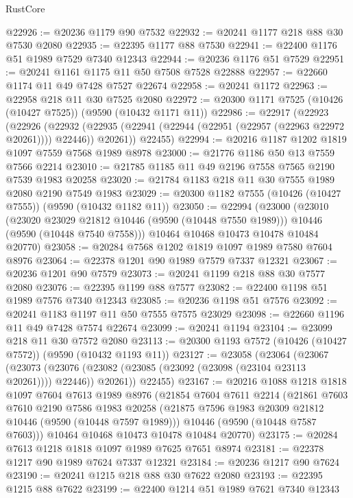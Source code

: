 \begin{lexlean}{RustCore}
\begin{coremodule}
@22926 := @20236 @1179 @90 @7532
@22932 := @20241 @1177 @218 @88 @30 @7530 @2080
@22935 := @22395 @1177 @88 @7530
@22941 := @22400 @1176 @51 @1989 @7529 @7340 @12343
@22944 := @20236 @1176 @51 @7529
@22951 := @20241 @1161 @1175 @11 @50 @7508 @7528 @22888
@22957 := @22660 @1174 @11 @49 @7428 @7527 @22674
@22958 := @20241 @1172
@22963 := @22958 @218 @11 @30 @7525 @2080
@22972 := @20300 @1171 @7525 (@10426 (@10427 @7525)) (@9590 (@10432 @1171 @11))
@22986 := @22917
    (@22923
      (@22926
        (@22932 (@22935 (@22941 (@22944 (@22951 (@22957 (@22963 @22972 @20261)))) @22446)) @20261))
      @22455)
@22994 := @20216 @1187 @1202 @1819 @1097 @7559 @7568 @1989 @8978
@23000 := @21776 @1186 @50 @13 @7559 @7566 @2214
@23010 := @21785 @1185 @11 @49 @2196 @7558 @7565 @2190 @7539 @1983 @20258
@23020 := @21784 @1183 @218 @11 @30 @7555 @1989 @2080 @2190 @7549 @1983
@23029 := @20300 @1182 @7555 (@10426 (@10427 @7555)) (@9590 (@10432 @1182 @11))
@23050 := @22994
    (@23000
      (@23010
        (@23020 @23029 @21812 @10446 (@9590 (@10448 @7550 @1989)))
        @10446
        (@9590 (@10448 @7540 @7558)))
      @10464
      @10468
      @10473
      @10478
      @10484
      @20770)
@23058 := @20284 @7568 @1202 @1819 @1097 @1989 @7580 @7604 @8976
@23064 := @22378 @1201 @90 @1989 @7579 @7337 @12321
@23067 := @20236 @1201 @90 @7579
@23073 := @20241 @1199 @218 @88 @30 @7577 @2080
@23076 := @22395 @1199 @88 @7577
@23082 := @22400 @1198 @51 @1989 @7576 @7340 @12343
@23085 := @20236 @1198 @51 @7576
@23092 := @20241 @1183 @1197 @11 @50 @7555 @7575 @23029
@23098 := @22660 @1196 @11 @49 @7428 @7574 @22674
@23099 := @20241 @1194
@23104 := @23099 @218 @11 @30 @7572 @2080
@23113 := @20300 @1193 @7572 (@10426 (@10427 @7572)) (@9590 (@10432 @1193 @11))
@23127 := @23058
    (@23064
      (@23067
        (@23073 (@23076 (@23082 (@23085 (@23092 (@23098 (@23104 @23113 @20261)))) @22446)) @20261))
      @22455)
@23167 := @20216
    @1088
    @1218
    @1818
    @1097
    @7604
    @7613
    @1989
    @8976
    (@21854
      @7604
      @7611
      @2214
      (@21861
        @7603
        @7610
        @2190
        @7586
        @1983
        @20258
        (@21875 @7596 @1983 @20309 @21812 @10446 (@9590 (@10448 @7597 @1989)))
        @10446
        (@9590 (@10448 @7587 @7603)))
      @10464
      @10468
      @10473
      @10478
      @10484
      @20770)
@23175 := @20284 @7613 @1218 @1818 @1097 @1989 @7625 @7651 @8974
@23181 := @22378 @1217 @90 @1989 @7624 @7337 @12321
@23184 := @20236 @1217 @90 @7624
@23190 := @20241 @1215 @218 @88 @30 @7622 @2080
@23193 := @22395 @1215 @88 @7622
@23199 := @22400 @1214 @51 @1989 @7621 @7340 @12343

\end{coremodule}
\end{lexlean}
